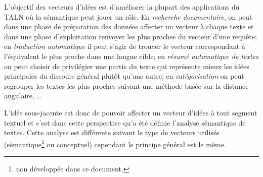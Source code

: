 { %




L'objectif des vecteurs d'idées est d'améliorer la plupart des
applications du TALN où la sémantique peut jouer un rôle. %
En \emph{recherche documentaire}, on peut dans une
phase de préparation des données affecter un vecteur à chaque texte et
dans une phase d'exploitation renvoyer les plus proches du vecteur
d'une requête; en \emph{traduction automatique} il peut s'agir de
trouver le vecteur correspondant à l'équivalent le plus proche dans
une langue cible; en
\emph{résumé automatique de textes} on peut choisir de privilégier une
partie du texte qui représente mieux les idées principales du discours
général plutôt qu'une autre; en \emph{catégorisation} on peut
regrouper les textes les plus proches suivant une méthode basée sur la
distance angulaire, \ldots} L'idée sous-jacente est donc de pouvoir
affecter un vecteur d'idées à tout segment
textuel et c'est dans cette perspective qu'a été définie l'analyse
sémantique de textes.  Cette analyse est différente suivant le type de
vecteurs utilisés (sémantique\footnote{non développée dans ce document.} ou conceptuel) cependant le principe
général est le même.

